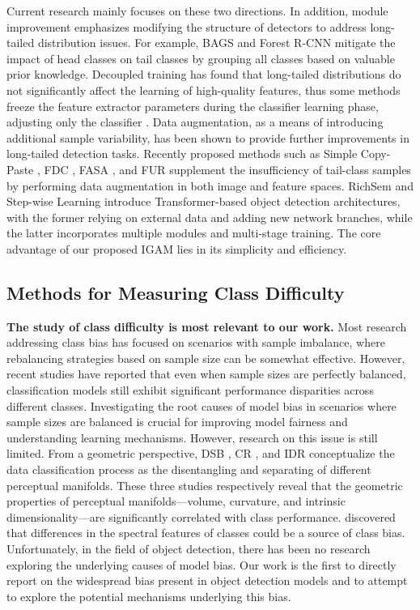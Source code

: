 Current research mainly focuses on these two directions. In addition, module improvement emphasizes modifying the structure of detectors to address long-tailed distribution issues. For example, BAGS \cite{bags} and Forest R-CNN \cite{forest} mitigate the impact of head classes on tail classes by grouping all classes based on valuable prior knowledge. Decoupled training \cite{decoupling} has found that long-tailed distributions do not significantly affect the learning of high-quality features, thus some methods freeze the feature extractor parameters during the classifier learning phase, adjusting only the classifier \cite{fdc,number4,zhang2021distribution}. Data augmentation, as a means of introducing additional sample variability, has been shown to provide further improvements in long-tailed detection tasks. Recently proposed methods such as Simple Copy-Paste \cite{copy_paste}, FDC \cite{fdc}, FASA \cite{fasa}, and FUR \cite{fur} supplement the insufficiency of tail-class samples by performing data augmentation in both image and feature spaces.
RichSem \cite{RichSem} and Step-wise Learning \cite{dong} introduce Transformer-based object detection architectures, with the former relying on external data and adding new network branches, while the latter incorporates multiple modules and multi-stage training. The core advantage of our proposed IGAM lies in its simplicity and efficiency.

\vspace{-3mm}
\subsection{Methods for Measuring Class Difficulty}
\label{sec2.2}
\vspace{-3mm}

\textbf{The study of class difficulty is most relevant to our work.} Most research addressing class bias has focused on scenarios with sample imbalance, where rebalancing strategies based on sample size can be somewhat effective. However, recent studies have reported that even when sample sizes are perfectly balanced, classification models still exhibit significant performance disparities across different classes. Investigating the root causes of model bias in scenarios where sample sizes are balanced is crucial for improving model fairness and understanding learning mechanisms. However, research on this issue is still limited. From a geometric perspective, DSB \cite{ma2023delving}, CR \cite{ma2023curvature}, and IDR \cite{ma2024unveiling} conceptualize the data classification process as the disentangling and separating of different perceptual manifolds. These three studies respectively reveal that the geometric properties of perceptual manifolds—volume, curvature, and intrinsic dimensionality—are significantly correlated with class performance. \cite{icml2024balanced} discovered that differences in the spectral features of classes could be a source of class bias. Unfortunately, in the field of object detection, there has been no research exploring the underlying causes of model bias.
Our work is the first to directly report on the widespread bias present in object detection models and to attempt to explore the potential mechanisms underlying this bias.

\vspace{-2mm}